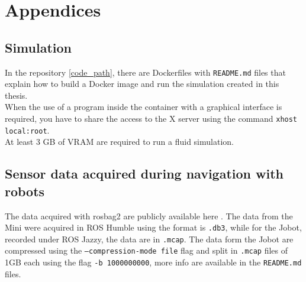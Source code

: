 \chapter{Appendices}
\section{Simulation}
In the repository \ref{code_path}, there are Dockerfiles with \texttt{README.md} files that explain how to build a Docker image and run the simulation created in this thesis.\\
When the use of a program inside the container with a graphical interface is required,  you have to share the access to the X server using the command \texttt{xhost local:root}.\\
At least 3 GB of VRAM are required to run a fluid simulation.
\section{Sensor data acquired during navigation with robots}\label{Sensor data}
The data acquired with rosbag2 are publicly available here \cite{data}.
The data from the Mini were acquired in ROS Humble using the format is \texttt{.db3}, while for the Jobot, recorded under ROS Jazzy, the data are in \texttt{.mcap}. The data form the Jobot are compressed using the \texttt{--compression-mode file} flag and split in \texttt{.mcap} files of 1GB each using the flag \texttt{-b 1000000000}, more info are available in the \texttt{README.md} files.
